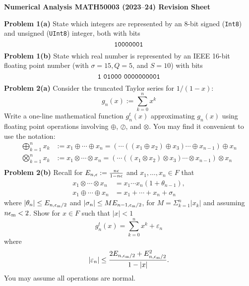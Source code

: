 \documentclass[12pt,a4paper]{article}
\def\endash{–}
\begin{document}
\textbf{Numerical Analysis MATH50003 (2023\ensuremath{\endash}24) Revision Sheet}

\textbf{Problem 1(a)} State which integers are represented by an 8-bit signed (\texttt{Int8}) and unsigned (\texttt{UInt8}) integer, both with   bits
\[
{\tt 10000001}
\]
\textbf{Problem 1(b)} State which real number is represented by an IEEE 16-bit floating point number (with $\ensuremath{\sigma} = 15, Q = 5$, and $S = 10$) with bits
\[
{\tt 1\ 01000\ 0000000001}
\]
\textbf{Problem 2(a)} Consider the truncated Taylor series for $1/(1-x)$:
\[
g_n(x) := \ensuremath{\sum}_{k=0}^n x^k
\]
Write  a one-line mathematical function $g_n^t(x)$ approximating $g_n(x)$ using floating point operations  involving $\ensuremath{\oplus}$, $\ensuremath{\oslash}$, and $\ensuremath{\otimes}$. You may find it convenient to use the notation:
\begin{align*}
\ensuremath{\bigoplus}_{k=1}^n x_k &:= x_1 \ensuremath{\oplus} \ensuremath{\cdots} \ensuremath{\oplus} x_n = (\ensuremath{\cdots}((x_1 \ensuremath{\oplus} x_2) \ensuremath{\oplus} x_3)\ensuremath{\cdots} \ensuremath{\oplus} x_{n-1}) \ensuremath{\oplus} x_n \\
\ensuremath{\bigotimes}_{k=1}^n x_k &:= x_1 \ensuremath{\otimes} \ensuremath{\cdots} \ensuremath{\otimes} x_n = (\ensuremath{\cdots}((x_1 \ensuremath{\otimes} x_2) \ensuremath{\otimes} x_3)\ensuremath{\cdots} \ensuremath{\otimes} x_{n-1}) \ensuremath{\otimes} x_n \\
\end{align*}
\textbf{Problem 2(b)} Recall for $E_{n,\ensuremath{\epsilon}} := {n \ensuremath{\epsilon} \over 1-n\ensuremath{\epsilon}}$ and $x_1,\ensuremath{\ldots},x_n \ensuremath{\in} F$ that
\begin{align*}
x_1 \ensuremath{\otimes} \ensuremath{\cdots} \ensuremath{\otimes} x_n &= x_1 \ensuremath{\cdots} x_n (1 + \ensuremath{\theta}_{n-1}),\\
x_1 \ensuremath{\oplus} \ensuremath{\cdots} \ensuremath{\oplus} x_n &= x_1 +  \ensuremath{\cdots} + x_n + \ensuremath{\sigma}_n
\end{align*}
where $|\ensuremath{\theta}_n| \ensuremath{\leq} E_{n,\ensuremath{\epsilon}_{\rm m}/2}$ and $|\ensuremath{\sigma}_n| \ensuremath{\leq} M E_{n-1,\ensuremath{\epsilon}_{\rm m}/2}$, for $M = \ensuremath{\Sigma}_{k=1}^n |x_k|$ and  assuming $n \ensuremath{\epsilon}_{\rm m} < 2$. Show for $x \ensuremath{\in} F$ such that $|x| < 1$
\[
g_n^t(x) = \ensuremath{\sum}_{k=0}^n x^k + \ensuremath{\varepsilon}_n
\]
where
\[
|\ensuremath{\varepsilon}_n| \ensuremath{\leq} {2E_{n,\ensuremath{\epsilon}_{\rm m}/2} + E_{n,\ensuremath{\epsilon}_{\rm m}/2}^2 \over  1- |x|}.
\]
You may assume all operations are normal.
\end{document}
